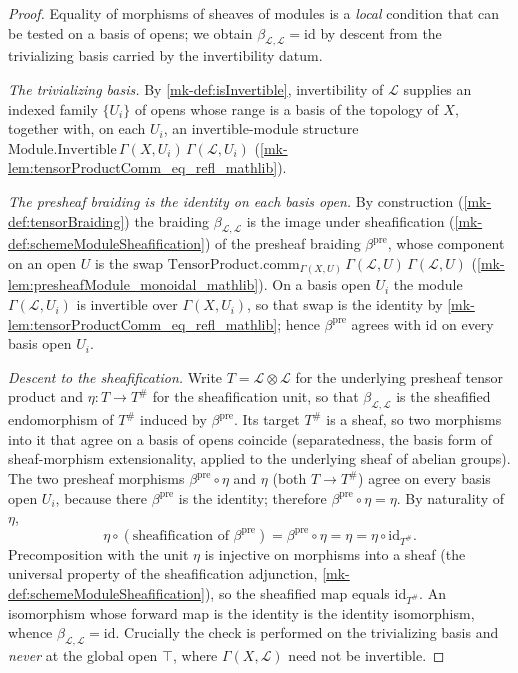 \begin{proof}
  \leanok
  Equality of morphisms of sheaves of modules is a \emph{local} condition that can
  be tested on a basis of opens; we obtain
  \(\beta_{\mathcal{L},\mathcal{L}} = \mathrm{id}\) by descent from the trivializing
  basis carried by the invertibility datum.

  \emph{The trivializing basis.} By \ref{mk-def:isInvertible}, invertibility of
  \(\mathcal{L}\) supplies an indexed family \(\{U_i\}\) of opens whose range is a
  basis of the topology of \(X\), together with, on each \(U_i\), an
  invertible-module structure
  \(\mathrm{Module.Invertible}\,\Gamma(X,U_i)\,\Gamma(\mathcal{L},U_i)\)
  (\ref{mk-lem:tensorProductComm_eq_refl_mathlib}).

  \emph{The presheaf braiding is the identity on each basis open.} By construction
  (\ref{mk-def:tensorBraiding}) the braiding \(\beta_{\mathcal{L},\mathcal{L}}\) is
  the image under sheafification (\ref{mk-def:schemeModuleSheafification}) of the
  presheaf braiding \(\beta^{\mathrm{pre}}\), whose component on an open \(U\) is the
  swap \(\mathrm{TensorProduct.comm}_{\Gamma(X,U)}\,\Gamma(\mathcal{L},U)\,
  \Gamma(\mathcal{L},U)\) (\ref{mk-lem:presheafModule_monoidal_mathlib}). On a basis
  open \(U_i\) the module \(\Gamma(\mathcal{L},U_i)\) is invertible over
  \(\Gamma(X,U_i)\), so that swap is the identity by
  \ref{mk-lem:tensorProductComm_eq_refl_mathlib}; hence \(\beta^{\mathrm{pre}}\)
  agrees with \(\mathrm{id}\) on every basis open \(U_i\).

  \emph{Descent to the sheafification.} Write \(T = \mathcal{L} \otimes
  \mathcal{L}\) for the underlying presheaf tensor product and
  \(\eta : T \to T^{\#}\) for the sheafification unit, so that
  \(\beta_{\mathcal{L},\mathcal{L}}\) is the sheafified endomorphism of \(T^{\#}\)
  induced by \(\beta^{\mathrm{pre}}\). Its target \(T^{\#}\) is a sheaf, so two
  morphisms into it that agree on a basis of opens coincide (separatedness, the
  basis form of sheaf-morphism extensionality, applied to the underlying sheaf of
  abelian groups). The two presheaf morphisms
  \(\beta^{\mathrm{pre}} \circ \eta\) and \(\eta\) (both \(T \to T^{\#}\)) agree on
  every basis open \(U_i\), because there \(\beta^{\mathrm{pre}}\) is the identity;
  therefore \(\beta^{\mathrm{pre}} \circ \eta = \eta\). By naturality of \(\eta\),
  \[
    \eta \circ (\text{sheafification of } \beta^{\mathrm{pre}})
      = \beta^{\mathrm{pre}} \circ \eta = \eta = \eta \circ \mathrm{id}_{T^{\#}}.
  \]
  Precomposition with the unit \(\eta\) is injective on morphisms into a sheaf (the
  universal property of the sheafification adjunction,
  \ref{mk-def:schemeModuleSheafification}), so the sheafified map equals
  \(\mathrm{id}_{T^{\#}}\). An isomorphism whose forward map is the identity is the
  identity isomorphism, whence \(\beta_{\mathcal{L},\mathcal{L}} = \mathrm{id}\).
  Crucially the check is performed on the trivializing basis and \emph{never} at the
  global open \(\top\), where \(\Gamma(X,\mathcal{L})\) need not be invertible.


\end{proof}
